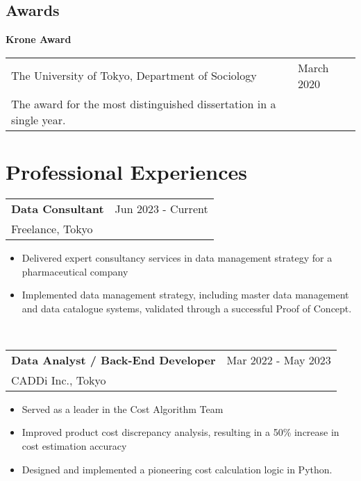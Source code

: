 \documentclass[11pt, a4paper]{article}
\begin{document}
\subsection*{Awards}
\textbf{Krone Award} \\
\begin{tabular}{@{}p{}p{}}
The University of Tokyo, Department of Sociology & \hfill March 2020 \\
The award for the most distinguished dissertation in a single year.
\end{tabular}

\section*{Professional Experiences}
\begin{tabular}{@{}p{}p{}}
\textbf{Data Consultant} & \hfill Jun 2023 - Current \\
Freelance, Tokyo \\
\end{tabular}
\begin{itemize}[noitemsep, topsep=0pt] %
    \item Delivered expert consultancy services in data management strategy for a pharmaceutical company
    \item Implemented data management strategy, including master data management and data catalogue systems, validated through a successful Proof of Concept.
\end{itemize} \\
\begin{tabular}{@{}p{}p{}}
\textbf{Data Analyst / Back-End Developer} & \hfill Mar 2022 - May 2023 \\
CADDi Inc., Tokyo \\
\end{tabular}
\begin{itemize}[noitemsep, topsep=0pt] %
    \item Served as a leader in the Cost Algorithm Team
    \item Improved product cost discrepancy analysis, resulting in a 50\% increase in cost estimation accuracy
    \item Designed and implemented a pioneering cost calculation logic in Python.
\end{itemize} \\
\end{document}
